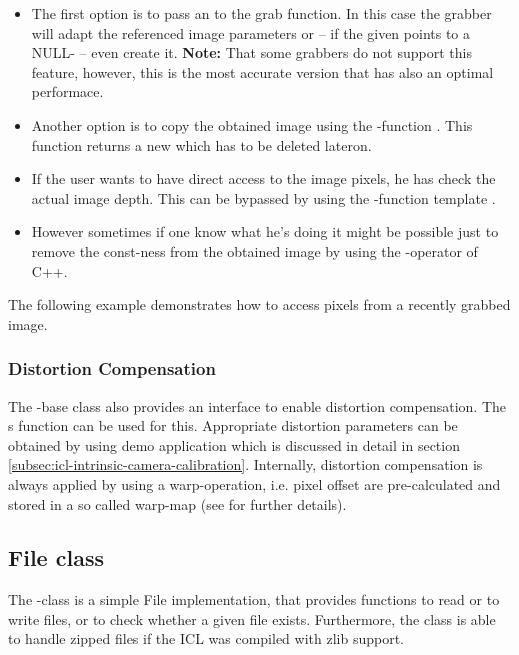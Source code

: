 \begin{itemize}
\item The first option is to pass an  to the grab function. In this case the grabber will adapt the referenced image parameters or -- if the given  points to a NULL- -- even create it. \textbf{Note:} That some grabbers do not support this feature, however, this is the most accurate version that has also an optimal performace.
\item Another option is to copy the obtained image using the -function . This function returns a new  which has to be deleted lateron.
\item If the user wants to have direct access to the image pixels, he has check the actual image depth. This can be bypassed by using the -function template .
\item However sometimes if one know what he's doing it might be possible just to remove the const-ness from the obtained image by using the -operator of C++.
\end{itemize} 

The following example demonstrates how to access pixels from a recently grabbed image.



\subsubsection{Distortion Compensation\label{subsubsec:distortion-compensation}}
The -base class also provides an interface to enable distortion compensation. The s  function can be used for this. Appropriate distortion parameters can be obtained by using demo application  which is discussed in detail in section \ref{subsec:icl-intrinsic-camera-calibration}. Internally, distortion compensation is always applied by using a warp-operation, i.e. pixel offset are pre-calculated and stored in a so called warp-map (see  for further details).

\subsection{File class}
The -class  is a simple File implementation, that provides functions to read or to write files, or to check whether a given file exists. Furthermore, the  class is able to handle zipped files if the ICL was compiled with zlib support.


